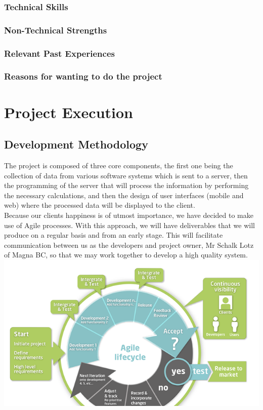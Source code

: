 \documentclass[a4paper,12pt]{article}
\begin{document}
\subsubsection{Technical Skills}
\subsubsection{Non-Technical Strengths}
\subsubsection{Relevant Past Experiences}
\subsubsection{Reasons for wanting to do the project}
\section{Project Execution}
\subsection{Development Methodology}
The project is composed of three core components, the first one being the collection of data from various software systems which is sent to a server, then the programming of the server that will process the information by performing the necessary calculations, and then the design of user interfaces (mobile and web) where the processed data will be displayed to the client.\\
Because our clients happiness is of utmost importance, we have decided to make use of Agile processes. With this approach, we will have deliverables that we will produce on a regular basis and from an early stage. This will facilitate communication between us as the developers and project owner, Mr Schalk Lotz of Magna BC, so that we may work together to develop a high quality system.\\
\includegraphics[width=\textwidth]{images/agileDev.png}
\end{document}
